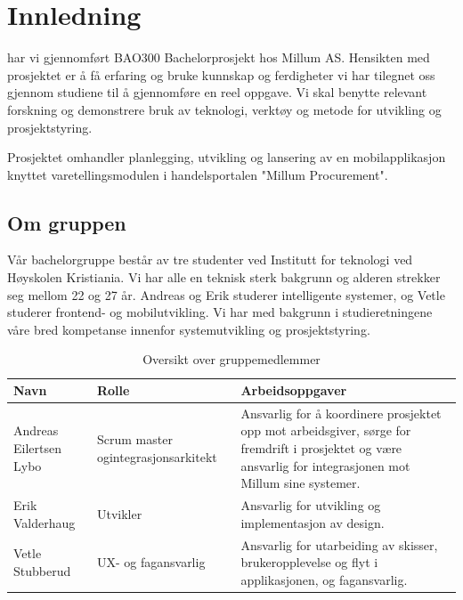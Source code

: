 \chapter{\color{Millum}\textbf{Innledning}}
 har vi gjennomført BAO300 Bachelorprosjekt hos Millum AS. Hensikten med prosjektet er å få erfaring og bruke kunnskap og ferdigheter vi har tilegnet oss gjennom studiene til å gjennomføre en reel oppgave. Vi skal benytte relevant forskning og demonstrere bruk av teknologi, verktøy og metode for utvikling og prosjektstyring.

Prosjektet omhandler planlegging, utvikling og lansering av en mobilapplikasjon knyttet varetellingsmodulen i handelsportalen "Millum Procurement".

\section{\textbf{Om gruppen}}
Vår bachelorgruppe består av tre studenter ved Institutt for teknologi ved Høyskolen Kristiania. Vi har alle en teknisk sterk bakgrunn og alderen strekker seg mellom 22 og 27 år. Andreas og Erik studerer intelligente systemer, og Vetle studerer frontend- og mobilutvikling. Vi har med bakgrunn i studieretningene våre bred kompetanse innenfor systemutvikling og prosjektstyring.

\begin{table}[htbp]
  \centering
  \caption{Oversikt over gruppemedlemmer}
    \begin{tabular}{|l|l|p{17.355em}|}
    \toprule
    Navn & Rolle & Arbeidsoppgaver \\
    \midrule
    \multicolumn{1}{|p{6.43em}|}{Andreas Eilertsen \newline{}Lybo} & \multicolumn{1}{p{7.215em}|}{Scrum master og\newline{}integrasjonsarkitekt} & Ansvarlig for å koordinere prosjektet opp mot arbeidsgiver, sørge for fremdrift i prosjektet og være ansvarlig for integrasjonen\newline{} mot Millum sine systemer. \\
    \midrule
    Erik Valderhaug & Utvikler & Ansvarlig for utvikling og \newline{}implementasjon av design. \\
    \midrule
    Vetle Stubberud & UX- og fagansvarlig & Ansvarlig for utarbeiding av skisser, \newline{}brukeropplevelse og flyt i applikasjonen, og \newline{}fagansvarlig. \\
    \bottomrule
    \end{tabular}%
  \label{tab:addlabel}%
\end{table}%

